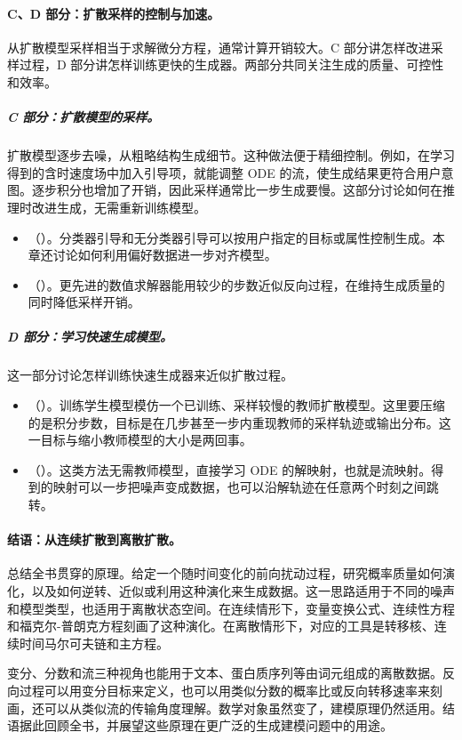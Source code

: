 \paragraph{C、D 部分：扩散采样的控制与加速。}

从扩散模型采样相当于求解微分方程，通常计算开销较大。C 部分讲怎样改进采样过程，D 部分讲怎样训练更快的生成器。两部分共同关注生成的质量、可控性和效率。

\subparagraph{C 部分：扩散模型的采样。}
扩散模型逐步去噪，从粗略结构生成细节。这种做法便于精细控制。例如，在学习得到的含时速度场中加入引导项，就能调整 ODE 的流，使生成结果更符合用户意图。逐步积分也增加了开销，因此采样通常比一步生成要慢。这部分讨论如何在推理时改进生成，无需重新训练模型。
\begin{itemize}
    \item {}（）。分类器引导和无分类器引导可以按用户指定的目标或属性控制生成。本章还讨论如何利用偏好数据进一步对齐模型。
    \item {}（）。更先进的数值求解器能用较少的步数近似反向过程，在维持生成质量的同时降低采样开销。
\end{itemize}
\subparagraph{D 部分：学习快速生成模型。}
这一部分讨论怎样训练快速生成器来近似扩散过程。
\begin{itemize}
    \item {}（）。训练学生模型模仿一个已训练、采样较慢的教师扩散模型。这里要压缩的是积分步数，目标是在几步甚至一步内重现教师的采样轨迹或输出分布。这一目标与缩小教师模型的大小是两回事。
    \item {}（）。这类方法无需教师模型，直接学习 ODE 的解映射，也就是流映射。得到的映射可以一步把噪声变成数据，也可以沿解轨迹在任意两个时刻之间跳转。
\end{itemize}

\paragraph{结语：从连续扩散到离散扩散。}
 总结全书贯穿的原理。给定一个随时间变化的前向扰动过程，研究概率质量如何演化，以及如何逆转、近似或利用这种演化来生成数据。这一思路适用于不同的噪声和模型类型，也适用于离散状态空间。在连续情形下，变量变换公式、连续性方程和福克尔-普朗克方程刻画了这种演化。在离散情形下，对应的工具是转移核、连续时间马尔可夫链和主方程。

变分、分数和流三种视角也能用于文本、蛋白质序列等由词元组成的离散数据。反向过程可以用变分目标来定义，也可以用类似分数的概率比或反向转移速率来刻画，还可以从类似流的传输角度理解。数学对象虽然变了，建模原理仍然适用。结语据此回顾全书，并展望这些原理在更广泛的生成建模问题中的用途。


